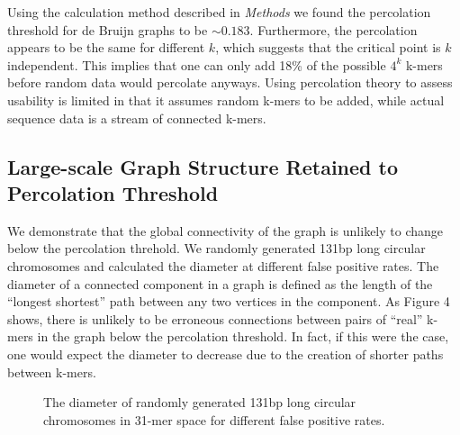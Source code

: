 \documentclass[12pt]{article} \usepackage{simplemargins}
\begin{document}
Using the calculation method described in \emph{Methods} we found the 
percolation threshold for de Bruijn graphs to be $\sim0.183$. 
Furthermore, the percolation appears to be the same for 
different $k$, which suggests that the 
critical point is $k$ independent.
This implies that one can only add 18\% of the possible $4^k$ k-mers
before random data would percolate anyways. Using percolation theory to 
assess usability is limited in that it assumes
random k-mers to be added, while actual sequence data is a stream of
connected k-mers.

\subsection{Large-scale Graph Structure Retained to Percolation Threshold}
We demonstrate that the global connectivity of the graph is unlikely 
to change below the percolation threhold. We randomly generated 131bp long circular 
chromosomes and calculated the diameter at different false positive rates. The diameter 
of a connected component in a graph is defined as the length of the ``longest shortest'' 
path between any two vertices in the component. As Figure 4 shows, there is unlikely to 
be erroneous connections between pairs of ``real'' k-mers in the graph below the 
percolation threshold. In fact, if this were the case, one would expect the diameter 
to decrease due to the creation of shorter paths between k-mers.

\begin{figure}
\caption{The diameter of randomly generated 131bp long circular chromosomes in 31-mer 
space for different false positive rates.}
\end{figure}
\end{document}
